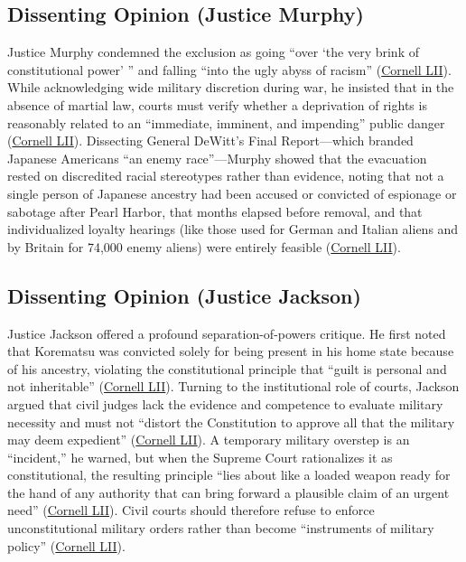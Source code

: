 \documentclass[12pt]{article}
\begin{document}
\subsection{Dissenting Opinion (Justice Murphy)}
Justice Murphy condemned the exclusion as going ``over `the very brink of constitutional power' '' and falling ``into the ugly abyss of racism'' (\href{https://www.law.cornell.edu/supremecourt/text/323/214}{Cornell LII}). While acknowledging wide military discretion during war, he insisted that in the absence of martial law, courts must verify whether a deprivation of rights is reasonably related to an ``immediate, imminent, and impending'' public danger (\href{https://www.law.cornell.edu/supremecourt/text/323/214}{Cornell LII}). Dissecting General DeWitt's Final Report---which branded Japanese Americans ``an enemy race''---Murphy showed that the evacuation rested on discredited racial stereotypes rather than evidence, noting that not a single person of Japanese ancestry had been accused or convicted of espionage or sabotage after Pearl Harbor, that months elapsed before removal, and that individualized loyalty hearings (like those used for German and Italian aliens and by Britain for 74,000 enemy aliens) were entirely feasible (\href{https://www.law.cornell.edu/supremecourt/text/323/214}{Cornell LII}).

\subsection{Dissenting Opinion (Justice Jackson)}
Justice Jackson offered a profound separation-of-powers critique. He first noted that Korematsu was convicted solely for being present in his home state because of his ancestry, violating the constitutional principle that ``guilt is personal and not inheritable'' (\href{https://www.law.cornell.edu/supremecourt/text/323/214}{Cornell LII}). Turning to the institutional role of courts, Jackson argued that civil judges lack the evidence and competence to evaluate military necessity and must not ``distort the Constitution to approve all that the military may deem expedient'' (\href{https://www.law.cornell.edu/supremecourt/text/323/214}{Cornell LII}). A temporary military overstep is an ``incident,'' he warned, but when the Supreme Court rationalizes it as constitutional, the resulting principle ``lies about like a loaded weapon ready for the hand of any authority that can bring forward a plausible claim of an urgent need'' (\href{https://www.law.cornell.edu/supremecourt/text/323/214}{Cornell LII}). Civil courts should therefore refuse to enforce unconstitutional military orders rather than become ``instruments of military policy'' (\href{https://www.law.cornell.edu/supremecourt/text/323/214}{Cornell LII}).
\end{document}
